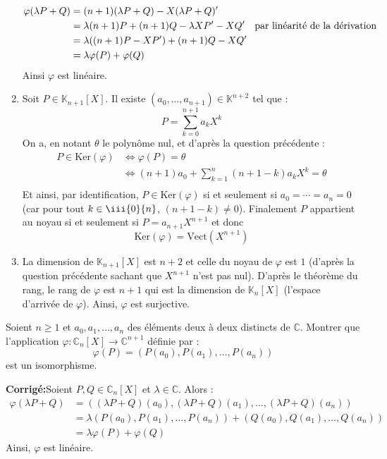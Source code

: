 \documentclass[a4paper,twoside,french,11pt]{VcCours}
\newcommand{\corr}{\textbf{Corrigé:}}
\begin{document}
\begin{enumerate}
\begin{align*}
\varphi(\lambda P + Q) & = (n+1)(\lambda P+Q)-X(\lambda P + Q)' \\
& = \lambda (n+1)P + (n+1)Q - \lambda X P' - XQ' \quad \hbox{par linéarité de la dérivation} \\
& = \lambda ((n+1)P-XP') + (n+1)Q-XQ' \\
& = \lambda \varphi(P) + \varphi(Q) 
\end{align*}
Ainsi $\varphi$ est linéaire.
\item Soit $P \in \mathbb{K}_{n+1}[X]$. Il existe $(a_0, \ldots, a_{n+1}) \in \mathbb{K}^{n+2}$ tel que :
$$ P = \sum_{k=0}^{n+1} a_k X^k $$
On a, en notant $\theta$ le polynôme nul, et d'après la question précédente : 
\begin{align*}
P \in \textrm{Ker}(\varphi) & \Longleftrightarrow  \varphi(P) = \theta \\
& \Longleftrightarrow (n+1) a_0 + \sum_{k=1}^n (n+1-k) a_k X^k =\theta  \\
\end{align*}
Et ainsi, par identification, $P \in \textrm{Ker}(\varphi)$ si et seulement si $a_0 = \cdots = a_n = 0$ (car pour tout $k \in \iii{0}{n}$, $(n+1-k) \neq 0$). Finalement $P$ appartient au noyau si et seulement si $P = a_{n+1} X^{n+1}$ et donc 
$$\textrm{Ker}(\varphi)= \textrm{Vect}(X^{n+1})$$
\item La dimension de $\mathbb{K}_{n+1}[X]$ est $n+2$ et celle du noyau de $\varphi$ est $1$ (d'après la question précédente sachant que $X^{n+1}$ n'est pas nul). D'après le théorème du rang, le rang de $\varphi$ est $n+1$ qui est la dimension de $\mathbb{K}_n[X]$ (l'espace d'arrivée de $\varphi$). Ainsi, $\varphi$ est surjective.
\end{enumerate}




\begin{Exercice}{} Soient $n \geq 1$ et $a_{0} ,a_{1} , \ldots ,a_{n}$ des éléments deux à deux distincts de $\mathbb{C}$. Montrer que l'application $\varphi \colon \mathbb{C}_n[X] \rightarrow \mathbb{C}^{n+1}$ définie par :
  \[
  \varphi(P) = (P(a_{0}),P(a_{1}), \ldots ,P(a_{n}))
  \]
  est un isomorphisme.
\end{Exercice}

\corr Soient $P,Q \in \mathbb{C}_n[X]$ et $\lambda \in \mathbb{C}$. Alors :
\begin{align*}
\varphi(\lambda P + Q ) & = ((\lambda P+Q)(a_{0}),(\lambda P+Q)(a_{1}), \ldots , (\lambda P+Q)(a_{n})) \\
& = \lambda (P(a_{0}),P(a_{1}), \ldots ,P(a_{n})) + (Q(a_{0}),Q(a_{1}), \ldots ,Q(a_{n})) \\
& = \lambda \varphi(P) + \varphi(Q)
\end{align*}
Ainsi, $\varphi$ est linéaire.
\end{document}

